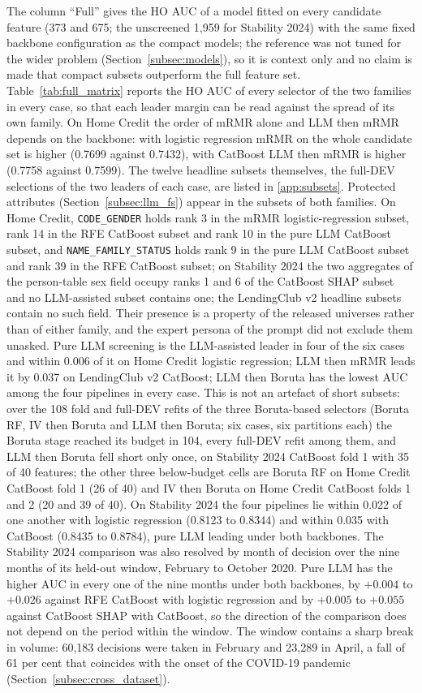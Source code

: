 \documentclass[final,5p,twocolumn]{elsarticle}
\begin{document}
The column ``Full'' gives the HO AUC of a model fitted on every candidate feature (373 and 675; the unscreened 1,959 for Stability 2024) with the same fixed backbone configuration as the compact models; the reference was not tuned for the wider problem (Section~\ref{subsec:models}), so it is context only and no claim is made that compact subsets outperform the full feature set. Table~\ref{tab:full_matrix} reports the HO AUC of every selector of the two families in every case, so that each leader margin can be read against the spread of its own family. On Home Credit the order of mRMR alone and LLM then mRMR depends on the backbone: with logistic regression mRMR on the whole candidate set is higher (0.7699 against 0.7432), with CatBoost LLM then mRMR is higher (0.7758 against 0.7599). The twelve headline subsets themselves, the full-DEV selections of the two leaders of each case, are listed in \ref{app:subsets}. Protected attributes (Section~\ref{subsec:llm_fs}) appear in the subsets of both families. On Home Credit, \texttt{CODE\_GENDER} holds rank 3 in the mRMR logistic-regression subset, rank 14 in the RFE CatBoost subset and rank 10 in the pure LLM CatBoost subset, and \texttt{NAME\_FAMILY\_STATUS} holds rank 9 in the pure LLM CatBoost subset and rank 39 in the RFE CatBoost subset; on Stability 2024 the two aggregates of the person-table sex field occupy ranks 1 and 6 of the CatBoost SHAP subset and no LLM-assisted subset contains one; the LendingClub v2 headline subsets contain no such field. Their presence is a property of the released universes rather than of either family, and the expert persona of the prompt did not exclude them unasked. Pure LLM screening is the LLM-assisted leader in four of the six cases and within 0.006 of it on Home Credit logistic regression; LLM then mRMR leads it by 0.037 on LendingClub v2 CatBoost; LLM then Boruta has the lowest AUC among the four pipelines in every case. This is not an artefact of short subsets: over the 108 fold and full-DEV refits of the three Boruta-based selectors (Boruta RF, IV then Boruta and LLM then Boruta; six cases, six partitions each) the Boruta stage reached its budget in 104, every full-DEV refit among them, and LLM then Boruta fell short only once, on Stability 2024 CatBoost fold 1 with 35 of 40 features; the other three below-budget cells are Boruta RF on Home Credit CatBoost fold 1 (26 of 40) and IV then Boruta on Home Credit CatBoost folds 1 and 2 (20 and 39 of 40). On Stability 2024 the four pipelines lie within 0.022 of one another with logistic regression (0.8123 to 0.8344) and within 0.035 with CatBoost (0.8435 to 0.8784), pure LLM leading under both backbones. The Stability 2024 comparison was also resolved by month of decision over the nine months of its held-out window, February to October 2020. Pure LLM has the higher AUC in every one of the nine months under both backbones, by $+0.004$ to $+0.026$ against RFE CatBoost with logistic regression and by $+0.005$ to $+0.055$ against CatBoost SHAP with CatBoost, so the direction of the comparison does not depend on the period within the window. The window contains a sharp break in volume: 60,183 decisions were taken in February and 23,289 in April, a fall of 61 per cent that coincides with the onset of the COVID-19 pandemic (Section~\ref{subsec:cross_dataset}).
\end{document}
